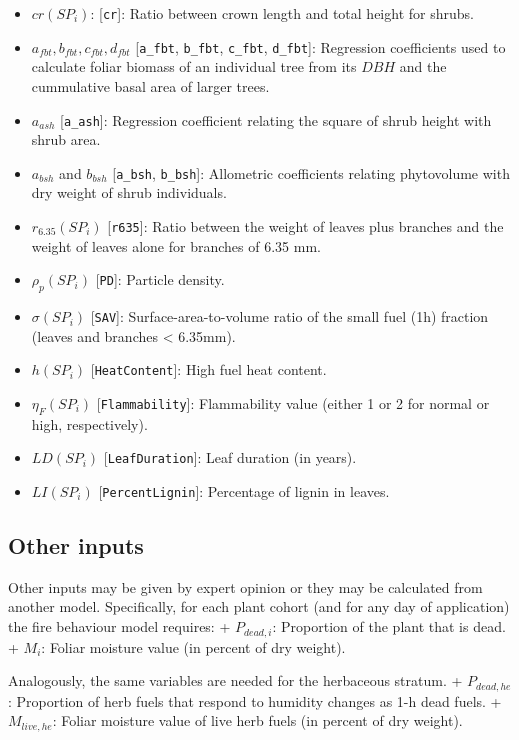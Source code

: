 \documentclass[]{book}
\providecommand{\tightlist}{%
  \setlength{\itemsep}{0pt}\setlength{\parskip}{0pt}}
\begin{document}
\begin{itemize}
\tightlist
\item
  \(cr(SP_i)\): {[}\texttt{cr}{]}: Ratio between crown length and total height for shrubs.
\item
  \(a_{fbt}, b_{fbt}, c_{fbt}, d_{fbt}\) {[}\texttt{a\_fbt}, \texttt{b\_fbt}, \texttt{c\_fbt}, \texttt{d\_fbt}{]}: Regression coefficients used to calculate foliar biomass of an individual tree from its \(DBH\) and the cummulative basal area of larger trees.
\item
  \(a_{ash}\) {[}\texttt{a\_ash}{]}: Regression coefficient relating the square of shrub height with shrub area.
\item
  \(a_{bsh}\) and \(b_{bsh}\) {[}\texttt{a\_bsh}, \texttt{b\_bsh}{]}: Allometric coefficients relating phytovolume with dry weight of shrub individuals.
\item
  \(r_{6.35}(SP_i)\) {[}\texttt{r635}{]}: Ratio between the weight of leaves plus branches and the weight of leaves alone for branches of 6.35 mm.
\item
  \(\rho_p(SP_i)\) {[}\texttt{PD}{]}: Particle density.
\item
  \(\sigma(SP_i)\) {[}\texttt{SAV}{]}: Surface-area-to-volume ratio of the small fuel (1h) fraction (leaves and branches \textless{} 6.35mm).
\item
  \(h(SP_i)\) {[}\texttt{HeatContent}{]}: High fuel heat content.
\item
  \(\eta_{F}(SP_i)\) {[}\texttt{Flammability}{]}: Flammability value (either 1 or 2 for normal or high, respectively).
\item
  \(LD(SP_i)\) {[}\texttt{LeafDuration}{]}: Leaf duration (in years).
\item
  \(LI(SP_i)\) {[}\texttt{PercentLignin}{]}: Percentage of lignin in leaves.
\end{itemize}

\hypertarget{other-inputs}{%
\subsection{Other inputs}\label{other-inputs}}

Other inputs may be given by expert opinion or they may be calculated from another model. Specifically, for each plant cohort (and for any day of application) the fire behaviour model requires:
+ \(P_{dead,i}\): Proportion of the plant that is dead.
+ \(M_i\): Foliar moisture value (in percent of dry weight).

Analogously, the same variables are needed for the herbaceous stratum.
+ \(P_{dead,he}\): Proportion of herb fuels that respond to humidity changes as 1-h dead fuels.
+ \(M_{live,he}\): Foliar moisture value of live herb fuels (in percent of dry weight).
\end{document}

